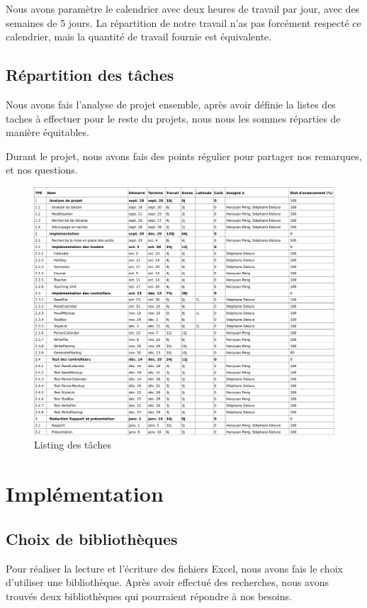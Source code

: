 \documentclass{polytech/polytech}
\begin{document}
	Nous avons paramètre le calendrier avec deux heures de travail par jour, avec des semaines de 5 jours.
	La répartition de notre travail n'as pas forcément respecté ce calendrier, mais la quantité de travail fournie est équivalente.

	\section{Répartition des tâches}

	Nous avons fais l'analyse de projet ensemble, après avoir définie la listes des taches à effectuer pour le reste du projets, nous nous les sommes réparties de manière équitables.

	Durant le projet, nous avons fais des points régulier pour partager nos remarques, et nos questions.

	\begin{figure}
		\caption{Listing des tâches}
		\includegraphics[width=\textwidth]{./img/taches-list.png}
	\end{figure}

	\chapter{Implémentation}

	\section{Choix de bibliothèques}

	Pour réaliser la lecture et l'écriture des fichiers Excel, nous avons fais le choix d'utiliser une bibliothèque.
	Après avoir effectué des recherches, nous avons trouvés deux bibliothèques qui pourraient répondre à nos besoins.
\end{document}

